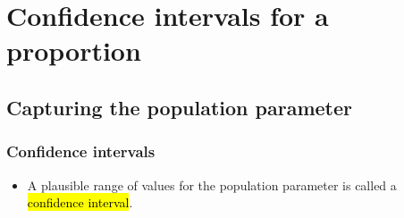 
\section{Confidence intervals for a proportion}


\subsection{Capturing the population parameter}


\begin{frame}[shrink]
\frametitle{Confidence intervals}

\begin{itemize}

\item A plausible range of values for the population parameter is called a \hl{confidence interval}.


\end{itemize}
\end{frame}
